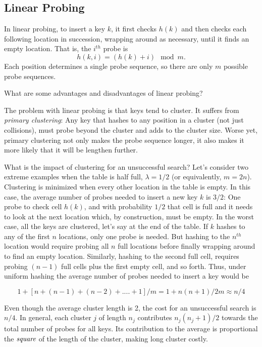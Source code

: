 \subsection{Linear Probing}

In linear probing, to insert a key $k$, it first checks $h(k)$ and
then checks each following location in succession, wrapping
around as necessary, until it finds an empty location.  That is, the
$i^{th}$ probe is \[h(k,i) = (h(k) + i) \mod m.\]  Each position
determines a single probe sequence, so there are only $m$ possible
probe sequences.

\begin{question}
What are some advantages and disadvantages of linear probing?
\end{question}

The problem with linear probing is that keys tend to cluster.  It
suffers from \emph{primary clustering}: Any key that hashes to any
position in a cluster (not just collisions), must probe beyond the
cluster and adds to the cluster size.  Worse yet, primary clustering
not only makes the probe sequence longer, it also makes it
more likely that it will be lengthen further.

What is the impact of clustering for an unsuccessful search? Let's
consider two extreme examples when the table is half full,
$\lambda=1/2$ (or equivalently, $m = 2n$).  Clustering is minimized
when every other location in the table is empty.  In this case, the
average number of probes needed to insert a new key $k$ is $3/2$: One
probe to check cell $h(k)$, and with probability $1/2$ that cell is
full and it needs to look at the next location which, by construction,
must be empty.  In the worst case, all the keys are clustered, let's
say at the end of the table. If $k$ hashes to any of the first $n$
locations, only one probe is needed.  But hashing to the $n^{th}$
location would require probing all $n$ full locations before finally
wrapping around to find an empty location.  Similarly, hashing to the
second full cell, requires probing $(n-1)$ full cells plus the first
empty cell, and so forth.  Thus, under uniform hashing the average
number of probes needed to insert a key would be

\[1 + [n + (n-1) + (n-2) + .... + 1]/m = 1 + n(n+1)/2m  \approx n/4 \]

Even though the average cluster length is 2, the cost for an
unsuccessful search is $n/4$. In general, each cluster $j$ of length
$n_j$ contributes $n_j(n_j+1)/2$ towards the total number of probes
for all keys.  Its contribution to the average is proportional the
$\emph{square}$ of the length of the cluster, making long cluster
costly.

